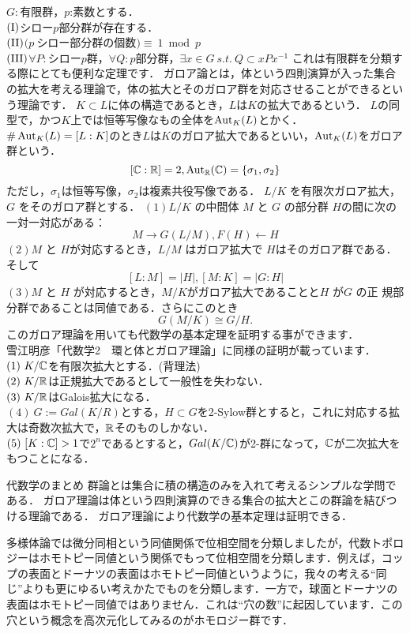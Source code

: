 \thm[シローの定理]
$G:$有限群，$p$:素数とする．\\
$\rm (I)$シロー$p$部分群が存在する．\\
$\rm (II)$$(p\ $シロー部分群の個数$)\equiv\ 1 \bmod p$\\
$\rm (III)$$\forall P:シローp$群，$\forall Q:p$部分群，$\exists x\in G\  s.t. \ Q\subset xPx^{-1}$
\thmx
これは有限群を分類する際にとても便利な定理です．
ガロア論とは，体という四則演算が入った集合の拡大を考える理論で，体の拡大とそのガロア群を対応させることができるという理論です．
$K \subset L$に体の構造であるとき，$L$は$K$の拡大であるという．
{}
$L$の同型で，かつ$K$上では恒等写像なもの全体を$\mathop{\mathrm{Aut}}\nolimits_K(L)$とかく．
$\# \mathop{\mathrm{Aut}}\nolimits_K(L)=[L:K]$のとき$L$は$K$のガロア拡大であるといい，$\mathop{\mathrm{Aut}}\nolimits_K(L)$をガロア群という．
\ex
\[
[\mathbb C:\mathbb R]=2,\mathop{\mathrm{Aut}}\nolimits_\mathbb R(\mathbb C) = \{\sigma_1,\sigma_2\}
\]
ただし，$\sigma_1$は恒等写像，$\sigma_2$は複素共役写像である．
\exx
\thm
$L/K$ を有限次ガロア拡大，$G$ をそのガロア群とする．
$(1)L/K$ の中間体 $M$ と $G$ の部分群 $H$の間に次の一対一対応がある：
\[
M \rightarrow G(L/M) , F(H) \leftarrow H
\]
$(2) M$ と $H $が対応するとき，$L/M$ はガロア拡大で $H$はそのガロア群である．
そして
\[
[L : M] = |H|, [M : K] = |G : H|
\]
$(3) M$ と $H$ が対応するとき，$M/K$がガロア拡大であることと$H$ が$G$ の正
規部分群であることは同値である．さらにこのとき
\[
G(M/K) \cong G/H. 
\]
\thmx
このガロア理論を用いても代数学の基本定理を証明する事ができます．
\proof[Galois理論による証明のポイント]
\leavevmode\\
雪江明彦「代数学2　環と体とガロア理論」に同様の証明が載っています．\\
$(1)\ K/\C$を有限次拡大とする．(背理法)\\
$(2)\ K/\R$は正規拡大であるとして一般性を失わない．\\
$(3)\ K/\mathbb R$はGalois拡大になる．\\
$(4)\ G:=Gal(K/R)$とする，$H\subset G$を2-Sylow群とすると，これに対応する拡大は奇数次拡大で，$\mathbb R$そのものしかない．\\
$(5)\ [K:\C]>1$で$2^n$であるとすると，$Gal(K/\mathbb C)$が2-群になって，$\mathbb C$が二次拡大をもつことになる．\\
\proofx
\begin{itembox}[l]{代数学のまとめ}
群論とは集合に積の構造のみを入れて考えるシンプルな学問である．
ガロア理論は体という四則演算のできる集合の拡大とこの群論を結びつける理論である．
ガロア理論により代数学の基本定理は証明できる．
\end{itembox}
多様体論では微分同相という同値関係で位相空間を分類しましたが，代数トポロジーはホモトピー同値という関係でもって位相空間を分類します．例えば，コップの表面とドーナツの表面はホモトピー同値というように，我々の考える``同じ''よりも更にゆるい考えかたでものを分類します．一方で，球面とドーナツの表面はホモトピー同値ではありません．これは``穴の数''に起因しています．この穴という概念を高次元化してみるのがホモロジー群です．

